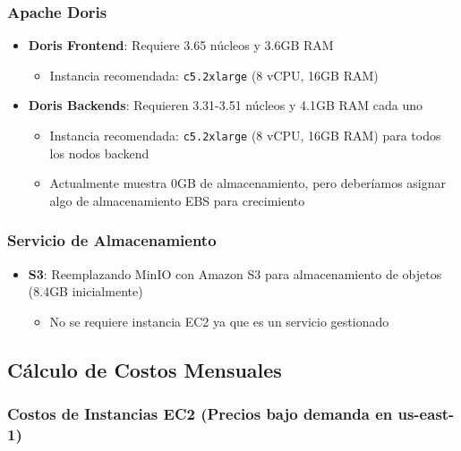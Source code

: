 \subsubsection{Apache Doris}

\begin{itemize}
    \item \textbf{Doris Frontend}: Requiere 3.65 núcleos y 3.6GB RAM
    \begin{itemize}
        \item Instancia recomendada: \texttt{c5.2xlarge} (8 vCPU, 16GB RAM)
    \end{itemize}
    
    \item \textbf{Doris Backends}: Requieren 3.31-3.51 núcleos y 4.1GB RAM cada uno
    \begin{itemize}
        \item Instancia recomendada: \texttt{c5.2xlarge} (8 vCPU, 16GB RAM) para todos los nodos backend
        \item Actualmente muestra 0GB de almacenamiento, pero deberíamos asignar algo de almacenamiento EBS para crecimiento
    \end{itemize}
\end{itemize}

\subsubsection{Servicio de Almacenamiento}

\begin{itemize}
    \item \textbf{S3}: Reemplazando MinIO con Amazon S3 para almacenamiento de objetos (8.4GB inicialmente)
    \begin{itemize}
        \item No se requiere instancia EC2 ya que es un servicio gestionado
    \end{itemize}
\end{itemize}

\subsection{Cálculo de Costos Mensuales}

\subsubsection{Costos de Instancias EC2 (Precios bajo demanda en us-east-1)}

